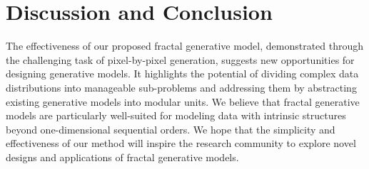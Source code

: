 \section{Discussion and Conclusion}
\label{sec:discussion}

The effectiveness of our proposed fractal generative model, demonstrated through the challenging task of pixel-by-pixel generation, suggests new opportunities for designing generative models. It highlights the potential of dividing complex data distributions into manageable sub-problems and addressing them by abstracting existing generative models into modular units. We believe that fractal generative models are particularly well-suited for modeling data with intrinsic structures beyond one-dimensional sequential orders. We hope that the simplicity and effectiveness of our method will inspire the research community to explore novel designs and applications of fractal generative models.